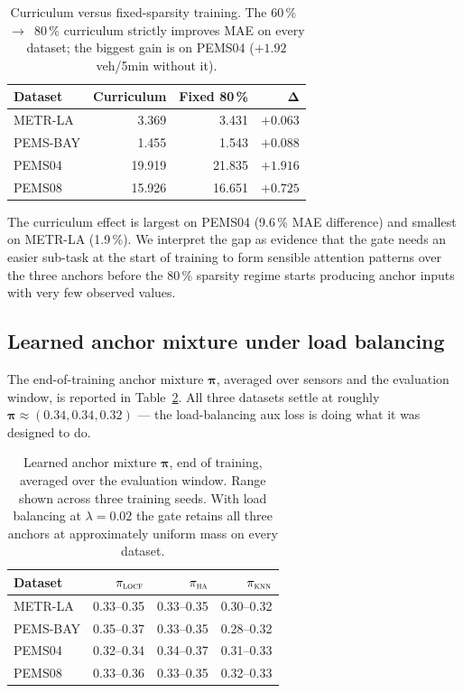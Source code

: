 \documentclass[11pt]{article}
\newcommand{\LOCF}{\textsc{locf}\xspace}
\newcommand{\HA}{\textsc{ha}\xspace}
\newcommand{\KNN}{\textsc{knn}\xspace}
\begin{document}
\begin{table}[!htbp]
\centering
\caption{Curriculum versus fixed-sparsity training.  The
60\,\%~$\rightarrow$~80\,\% curriculum strictly improves MAE on every
dataset; the biggest gain is on PEMS04 ($+1.92$ veh/5min without it).}
\label{tab:curriculum}
\small
\begin{tabular}{lrrr}
\toprule
\textbf{Dataset} & \textbf{Curriculum} & \textbf{Fixed 80\,\%} & $\boldsymbol{\Delta}$ \\
\midrule
METR-LA  & 3.369  & 3.431  & $+0.063$ \\
PEMS-BAY & 1.455  & 1.543  & $+0.088$ \\
PEMS04   & 19.919 & 21.835 & $+1.916$ \\
PEMS08   & 15.926 & 16.651 & $+0.725$ \\
\bottomrule
\end{tabular}
\end{table}

The curriculum effect is largest on PEMS04 (9.6\,\% MAE difference)
and smallest on METR-LA (1.9\,\%).  We interpret the gap as evidence
that the gate needs an easier sub-task at the start of training to
form sensible attention patterns over the three anchors before the
80\,\% sparsity regime starts producing anchor inputs with very few
observed values.

\subsection{Learned anchor mixture under load balancing}
\label{sec:results-mix}

The end-of-training anchor mixture $\bm{\pi}$, averaged over sensors
and the evaluation window, is reported in Table~\ref{tab:mix}.  All
three datasets settle at roughly $\bm{\pi} \approx (0.34, 0.34, 0.32)$
--- the load-balancing aux loss is doing what it was designed to do.

\begin{table}[!htbp]
\centering
\caption{Learned anchor mixture $\bm{\pi}$, end of training, averaged
over the evaluation window.  Range shown across three training seeds.
With load balancing at $\lambda = 0.02$ the gate retains all three
anchors at approximately uniform mass on every dataset.}
\label{tab:mix}
\small
\begin{tabular}{lrrr}
\toprule
\textbf{Dataset} & $\pi_{\LOCF}$ & $\pi_{\HA}$ & $\pi_{\KNN}$ \\
\midrule
METR-LA   & 0.33--0.35 & 0.33--0.35 & 0.30--0.32 \\
PEMS-BAY  & 0.35--0.37 & 0.33--0.35 & 0.28--0.32 \\
PEMS04    & 0.32--0.34 & 0.34--0.37 & 0.31--0.33 \\
PEMS08    & 0.33--0.36 & 0.33--0.35 & 0.32--0.33 \\
\bottomrule
\end{tabular}
\end{table}
\end{document}

